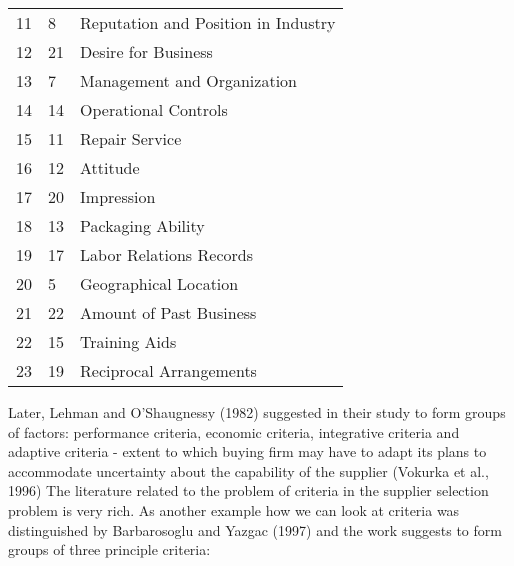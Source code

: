 \documentclass[oneside,12pt]{article}%
\begin{document}
\begin{table}[h]
\begin{tabular}{lll}
    \multicolumn{1}{l|}{11}      & \multicolumn{1}{l|}{8}            & Reputation and Position in Industry                                               \\
    \multicolumn{1}{l|}{12}      & \multicolumn{1}{l|}{21}           & Desire for Business                                                               \\
    \multicolumn{1}{l|}{13}      & \multicolumn{1}{l|}{7}            & Management and Organization                                                       \\
    \multicolumn{1}{l|}{14}      & \multicolumn{1}{l|}{14}           & Operational Controls                                                              \\
    \multicolumn{1}{l|}{15}      & \multicolumn{1}{l|}{11}           & Repair Service                                                                    \\
    \multicolumn{1}{l|}{16}      & \multicolumn{1}{l|}{12}           & Attitude                                                                          \\
    \multicolumn{1}{l|}{17}      & \multicolumn{1}{l|}{20}           & Impression                                                                        \\
    \multicolumn{1}{l|}{18}      & \multicolumn{1}{l|}{13}           & Packaging Ability                                                                 \\
    \multicolumn{1}{l|}{19}      & \multicolumn{1}{l|}{17}           & Labor Relations Records                                                           \\
    \multicolumn{1}{l|}{20}      & \multicolumn{1}{l|}{5}            & Geographical Location                                                             \\
    \multicolumn{1}{l|}{21}      & \multicolumn{1}{l|}{22}           & Amount of Past Business                                                           \\
    \multicolumn{1}{l|}{22}      & \multicolumn{1}{l|}{15}           & Training Aids                                                                     \\
    \multicolumn{1}{l|}{23}      & \multicolumn{1}{l|}{19}           & Reciprocal Arrangements
  \end{tabular}
\end{table}

Later, Lehman and O’Shaugnessy (1982) suggested in their study to form groups of factors: performance criteria, economic criteria, integrative criteria and adaptive criteria - extent to which buying firm may have to adapt its plans to accommodate uncertainty about the capability of the supplier (Vokurka et al., 1996) The literature related to the problem of criteria in the supplier selection problem is very rich. As another example how we can look at criteria was distinguished by Barbarosoglu and Yazgac (1997) and the work suggests to form groups of three principle criteria:
\end{document}
